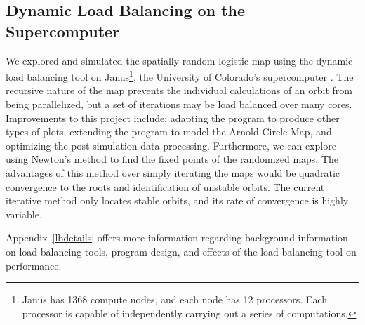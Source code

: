\subsection{Dynamic Load Balancing on the Supercomputer}
We explored and simulated the spatially random logistic map using the
dynamic load balancing tool on Janus\footnote{Janus has 1368 compute nodes, and
  each node has 12 processors. Each processor is capable of
  independently carrying
  out a series of computations.}, the University of Colorado's supercomputer
\cite{janus}. The recursive nature of the map prevents the individual
calculations of an orbit from being parallelized, but a set of
iterations may be load balanced over many
cores. Improvements to this project include: adapting the program to
produce other types of plots, extending the program to model
the Arnold Circle Map, and optimizing the post-simulation data
processing. Furthermore, we can explore using Newton's method to find
the fixed points of the randomized maps. The advantages of this method
over simply iterating the maps would be quadratic convergence to the
roots and identification of unstable orbits. The current iterative
method only locates stable orbits, and its rate of convergence is
highly variable. 

Appendix~\ref{lbdetails} offers more information regarding
background information on load balancing tools, program design, and effects of the load balancing tool on performance.